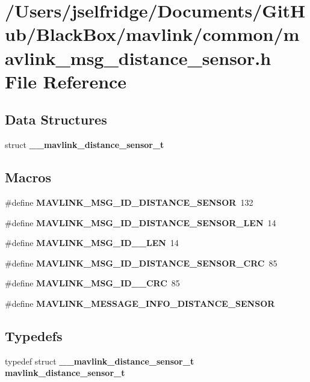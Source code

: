 \section{/\+Users/jselfridge/\+Documents/\+Git\+Hub/\+Black\+Box/mavlink/common/mavlink\+\_\+msg\+\_\+distance\+\_\+sensor.h File Reference}
\label{mavlink__msg__distance__sensor_8h}
\subsection*{Data Structures}
\begin{DoxyCompactItemize}
\item 
struct \textbf{ \+\_\+\+\_\+mavlink\+\_\+distance\+\_\+sensor\+\_\+t}
\end{DoxyCompactItemize}
\subsection*{Macros}
\begin{DoxyCompactItemize}
\item 
\#define \textbf{ M\+A\+V\+L\+I\+N\+K\+\_\+\+M\+S\+G\+\_\+\+I\+D\+\_\+\+D\+I\+S\+T\+A\+N\+C\+E\+\_\+\+S\+E\+N\+S\+OR}~132
\item 
\#define \textbf{ M\+A\+V\+L\+I\+N\+K\+\_\+\+M\+S\+G\+\_\+\+I\+D\+\_\+\+D\+I\+S\+T\+A\+N\+C\+E\+\_\+\+S\+E\+N\+S\+O\+R\+\_\+\+L\+EN}~14
\item 
\#define \textbf{ M\+A\+V\+L\+I\+N\+K\+\_\+\+M\+S\+G\+\_\+\+I\+D\+\_\+\_\+\+L\+EN}~14
\item 
\#define \textbf{ M\+A\+V\+L\+I\+N\+K\+\_\+\+M\+S\+G\+\_\+\+I\+D\+\_\+\+D\+I\+S\+T\+A\+N\+C\+E\+\_\+\+S\+E\+N\+S\+O\+R\+\_\+\+C\+RC}~85
\item 
\#define \textbf{ M\+A\+V\+L\+I\+N\+K\+\_\+\+M\+S\+G\+\_\+\+I\+D\+\_\+\_\+\+C\+RC}~85
\item 
\#define \textbf{ M\+A\+V\+L\+I\+N\+K\+\_\+\+M\+E\+S\+S\+A\+G\+E\+\_\+\+I\+N\+F\+O\+\_\+\+D\+I\+S\+T\+A\+N\+C\+E\+\_\+\+S\+E\+N\+S\+OR}
\end{DoxyCompactItemize}
\subsection*{Typedefs}
\begin{DoxyCompactItemize}
\item 
typedef struct \textbf{ \+\_\+\+\_\+mavlink\+\_\+distance\+\_\+sensor\+\_\+t} \textbf{ mavlink\+\_\+distance\+\_\+sensor\+\_\+t}
\end{DoxyCompactItemize}


